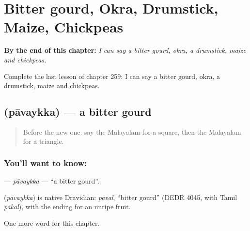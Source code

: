 
\chapter{Bitter gourd, Okra, Drumstick, Maize, Chickpeas}
\label{ch:ml-bitter-gourd-okra-drumstick-maize-chickpeas}

\begin{chapteropening}
\textbf{By the end of this chapter:} \emph{I can say a bitter gourd, okra, a drumstick, maize and chickpeas.}

Complete the last lesson of chapter 259: I can say a bitter gourd, okra, a drumstick, maize and chickpeas.
\end{chapteropening}

\section[\texorpdfstring{\ml{പാവയ്ക്ക} (pāvaykka)}{പാവയ്ക്ക (pāvaykka)}]{ (pāvaykka) — a bitter gourd}

\label{lesson:ML-C259-pavaykka}



\begin{quote}
Before the new one: say the Malayalam for a square, then the Malayalam for a triangle.
\end{quote}

\subsection*{You'll want to know: }
\textbf{} — \emph{pāvaykka} — \textquotedblleft{}a bitter gourd\textquotedblright{}.

\begin{cousinweb}
\textbf{} (\emph{pāvaykka}) is native Dravidian: \emph{pāval}, \textquotedblleft{}bitter gourd\textquotedblright{} (DEDR 4045, with Tamil \emph{pākal}), with the ending for an unripe fruit.
\end{cousinweb}

\begin{grammarlens}[title={What you've built}]
One more word for this chapter.
\end{grammarlens}

